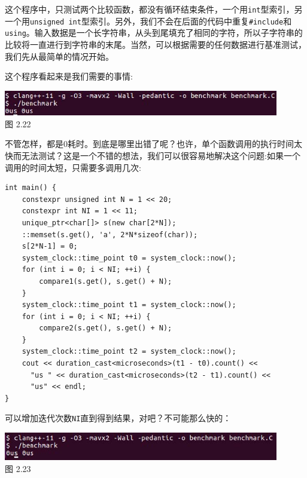 这个程序中，只测试两个比较函数，都没有循环结束条件，一个用\texttt{int}型索引，另一个用\texttt{unsigned int}型索引。另外，我们不会在后面的代码中重复\texttt{\#include}和\texttt{using}。输入数据是一个长字符串，从头到尾填充了相同的字符，所以子字符串的比较将一直进行到字符串的末尾。当然，可以根据需要的任何数据进行基准测试，我们先从最简单的情况开始。

这个程序看起来是我们需要的事情:

\begin{center}
\includegraphics[width=0.9\textwidth]{content/1/chapter2/images/22.jpg}\\
图 2.22
\end{center}

不管怎样，都是0耗时。到底是哪里出错了呢？也许，单个函数调用的执行时间太快而无法测试？这是一个不错的想法，我们可以很容易地解决这个问题:如果一个调用的时间太短，只需要多调用几次:

\begin{lstlisting}[style=styleCXX]
int main() {
	constexpr unsigned int N = 1 << 20;
	constexpr int NI = 1 << 11;
	unique_ptr<char[]> s(new char[2*N]);
	::memset(s.get(), 'a', 2*N*sizeof(char));
	s[2*N-1] = 0;
	system_clock::time_point t0 = system_clock::now();
	for (int i = 0; i < NI; ++i) {
		compare1(s.get(), s.get() + N);
	}
	system_clock::time_point t1 = system_clock::now();
	for (int i = 0; i < NI; ++i) {
		compare2(s.get(), s.get() + N);
	}
	system_clock::time_point t2 = system_clock::now();
	cout << duration_cast<microseconds>(t1 - t0).count() <<
	  "us " << duration_cast<microseconds>(t2 - t1).count() <<
	  "us" << endl;
}
\end{lstlisting}

可以增加迭代次数\texttt{NI}直到得到结果，对吧？不可能那么快的：

\begin{center}
\includegraphics[width=0.9\textwidth]{content/1/chapter2/images/23.jpg}\\
图 2.23
\end{center}

